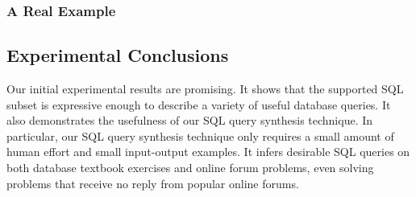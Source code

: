 \subsubsection{A Real Example}


\subsection{Experimental Conclusions}

Our initial experimental results are promising.
It shows that the supported SQL subset is
expressive enough to describe a variety of useful database queries.
It also demonstrates the usefulness of our SQL query
synthesis technique.  In particular, our SQL query synthesis technique only requires a small amount of
human effort and small input-output examples. It infers 
desirable SQL queries on both database textbook exercises
and online forum problems, even solving problems that receive no reply
from popular online forums.




